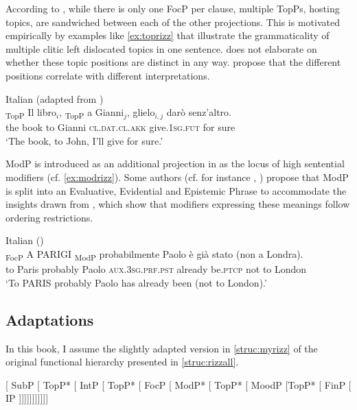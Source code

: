 According to \citet{Rizzi1997}, while   there is only one FocP per clause,  multiple  TopPs, hosting topics, are sandwiched between each of the other projections. This is motivated empirically by examples like \eqref{ex:toprizz} that illustrate the grammaticality of multiple clitic left dislocated topics in one sentence. \citet{Rizzi1997} does not elaborate on whether these topic positions are distinct in any way. \citet{Frascarelli2007a}  propose that the different positions correlate with different interpretations.

\ea\label{ex:toprizz}Italian (adapted from \citealt[290: ex 21]{Rizzi1997}) \\ \gll {\ob}\textsubscript{TopP} Il libro$_i${\cb}, {\ob}\textsubscript{TopP} a Gianni$_j${\cb}, glielo$_{i,j}$ darò senz'altro. \\
{} the book {} to Gianni \textsc{cl.dat}.\textsc{cl.akk} give.\textsc{1sg.fut} {for sure}\\
\glt`The book, to John, I'll give for sure.' 
\z

ModP is introduced as an additional projection in \citet{Rizzi2004} as the locus of  high sentential  modifiers (cf. \ref{ex:modrizz}). Some authors (cf. for instance \citealt[84]{Giorgi2010}, \citealt[248]{vanGelderen2011}) propose that ModP is  split into an Evaluative, Evidential and Epistemic Phrase to accommodate the insights drawn from \citet{Cinque1999}, which show that  modifiers expressing these meanings follow  ordering restrictions.

\ea\label{ex:modrizz}
Italian (\citealt[77: ex 38]{Giorgi2010})\\
\gll {\ob}\textsubscript{FocP} A PARIGI{\cb} {\ob}\textsubscript{ModP} probabilmente{\cb} Paolo è già stato (non a Londra). \\
{} to Paris {} probably Paolo \textsc{aux.3sg.prf.pst} already be.\textsc{ptcp} not to London\\
\glt`To PARIS probably Paolo has already been (not to London).' 
\z

\subsection{Adaptations}
In this book, I assume the slightly adapted version in \eqref{struc:myrizz} of the original functional hierarchy  presented in \eqref{struc:rizzall}. 

\ea\label{struc:myrizz} {[} SubP [ TopP* [ IntP [ TopP* [ FocP [ ModP* [ TopP* [ MoodP [TopP* [ FinP [ IP ]]]]]]]]]]] 
\z


